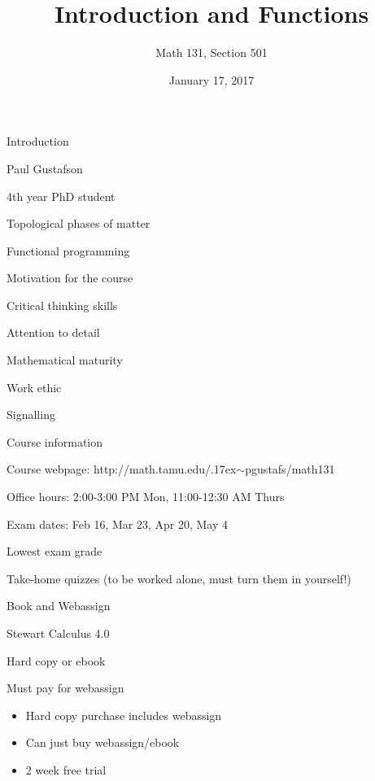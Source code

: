 \documentclass[t]{beamer}
\title{Introduction and Functions}
\author{Math 131, Section 501}
\date{January 17, 2017}
\newenvironment{fpi}
  {\itemize[nolistsep,itemsep=\fill]}
  {\vfill\enditemize}
\begin{document}
\frame{\titlepage}


\begin{frame}{Introduction}
\begin{fpi}
\item Paul Gustafson
\item 4th year PhD student
\item Topological phases of matter 
\item Functional programming
\end{fpi}
\end{frame}

\begin{frame}{Motivation for the course}
\begin{fpi}
\item Critical thinking skills
\item Attention to detail
\item Mathematical maturity 
\item Work ethic
\item Signalling 
\end{fpi}
\end{frame}

\begin{frame}{Course information}
\begin{fpi}
\item Course webpage: http://math.tamu.edu/{\raise.17ex\hbox{$\scriptstyle\sim$}}pgustafs/math131
\item Office hours: 2:00-3:00 PM Mon, 11:00-12:30 AM Thurs 
\item Exam dates: Feb 16, Mar 23, Apr 20, May 4
\item Lowest exam grade
\item Take-home quizzes (to be worked alone, must turn them in yourself!)
\end{fpi}
\end{frame}

\begin{frame}{Book and Webassign}
\begin{fpi}
\item Stewart Calculus 4.0
\item Hard copy or ebook
\item Must pay for webassign
\begin{itemize}
\item Hard copy purchase includes webassign
\item Can just buy webassign/ebook
\item 2 week free trial 
\end{itemize}
\end{fpi}
\end{frame}
\end{document}
